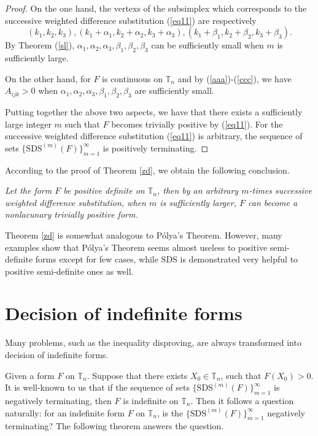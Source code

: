\documentclass [10pt,a4paper]{article}
\begin{document}
\begin{proof}
 On the one hand,   the  vertexs of the subsimplex which corresponds to the  successive weighted dif\mbox{}ference
 substitution (\ref{eq11})  are respectively
 $$(k_1,k_2,k_3),
(k_1+\alpha_1,k_2+\alpha_2,k_3+\alpha_3),
(k_1+\beta_1,k_2+\beta_2,k_3+\beta_3).$$
By Theorem (\ref{sl}),
 $\alpha_1,\alpha_2,\alpha_3,\beta_1,\beta_2,\beta_3$ can be suf\mbox{}f\mbox{}iciently small
 when $m$ is  suf\mbox{}f\mbox{}iciently  large.


 On the other hand, for $F$ is continuous on $\mathbb{T}_n$ and by
 (\ref{aaa})-(\ref{ccc}), we have $A_{ijk}>
 0$ when $\alpha_1,\alpha_2,\alpha_3,\beta_1,\beta_2,\beta_3$ are suf\mbox{}f\mbox{}iciently
 small.

Putting together the above two aspects,  we have that  there exists
a  suf\mbox{}f\mbox{}iciently  large integer $m$  such that $F$
becomes trivially positive by (\ref{eq11}).
 For the successive weighted dif\mbox{}ference substitution (\ref{eq11}) is arbitrary, the sequence of  sets $\{\textrm{SDS}^{(m)}(F)\}_{m=1}^\infty$ is
positively terminating. \end{proof}

According to the proof of Theorem  \ref{zd}, we obtain the following
conclusion.

\begin{corollary}\label{zd111}
\emph{Let the form $F$ be positive definite on $\mathbb{T}_n$,  then
by an arbitrary $m$-times successive weighted dif\mbox{}ference
substitution,  when $m$ is suf\mbox{}f\mbox{}iciently larger,  $F$
can become a nonlacunary  trivially positive  form.} \label{gzd}
\end{corollary}

Theorem  \ref{zd} is somewhat analogous to  P\'{o}lya's Theorem.
However,  many examples show that P\'{o}lya's Theorem seems almost
useless to positive semi-definite forms except for few cases, while
SDS is demonstrated very helpful to positive semi-definite ones as
well.


\section{Decision of indef\mbox{}inite forms}

Many problems,  such  as the inequality disproving, are always
transformed into decision of indef\mbox{}inite forms.

 Given a form
$F$ on $\mathbb{T}_n$. Suppose that there exists $X_0\in
\mathbb{T}_n$, such that $F(X_0)>0$. It is well-known to us that if
the sequence of sets $\{\textrm{SDS}^{(m)}(F)\}_{m=1}^\infty$ is
negatively terminating, then $F$  is indef\mbox{}inite on
$\mathbb{T}_n$. Then it follows a question naturally: for an
indef\mbox{}inite form $F$ on $\mathbb{T}_n$, is the
$\{\textrm{SDS}^{(m)}(F)\}_{m=1}^\infty$ negatively terminating? The
following theorem answers the question.
\end{document}
